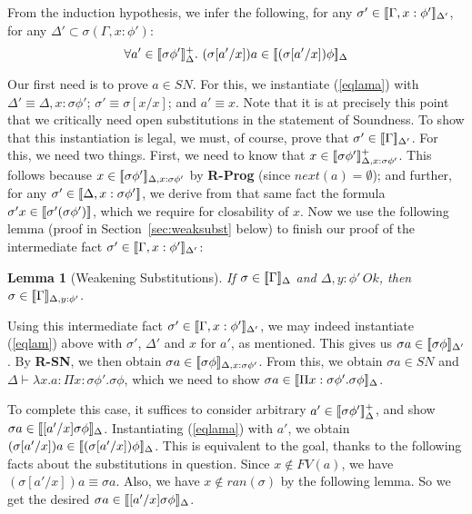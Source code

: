 \documentclass[copyright]{eptcs}
\newtheorem{lemma}{Lemma}
\newcommand{\next}[0]{\textit{next}}
\newcommand{\SN}[0]{\textit{SN}}
\newcommand{\interp}[1]{[\negthinspace[#1]\negthinspace]}
\begin{document}
\noindent From the
induction hypothesis, we infer the following, for any
$\sigma'\in\interp{\Gamma,x:\phi'}_{\Delta'}$, for any
$\Delta'\subset\sigma (\Gamma,x:\phi')$:
\begin{equation}
\label{eqlama}
\forall a'\in\interp{\sigma \phi'}^+_{\Delta}.\ (\sigma[a'/x]) a\in\interp{(\sigma[a'/x])\phi}_{\Delta}
\end{equation}

\noindent Our first need is to prove $a\in\SN$.  For this, we
instantiate (\ref{eqlama}) with $\Delta'\equiv \Delta,x:\sigma\phi'$;
$\sigma'\equiv\sigma[x/x]$; and $a'\equiv x$.  Note that it is at
precisely this point that we critically need open substitutions in the
statement of Soundness.  To show that this instantiation is legal, we
must, of course, prove that $\sigma'\in\interp{\Gamma}_{\Delta'}$.
For this, we need two things.  First, we need to know that
$x\in\interp{\sigma \phi'}^+_{\Delta,x:\sigma\phi'}$.  This follows
because $x\in\interp{\sigma \phi'}_{\Delta,x:\sigma\phi'}$ by
\textbf{R-Prog} (since $\next(a) = \emptyset$); and further, for any
$\sigma'\in\interp{\Delta,x:\sigma\phi'}$, we derive from that same
fact the formula $\sigma' x\in\interp{\sigma'(\sigma\phi')}$, which we
require for closability of $x$.  Now we use the following lemma (proof
in Section~\ref{sec:weaksubst} below) to finish our proof of the
intermediate fact $\sigma'\in\interp{\Gamma,x:\phi'}_{\Delta'}$:

\begin{lemma}[Weakening Substitutions]
\label{lem:weaksubst}
If $\sigma\in\interp{\Gamma}_{\Delta}$ and
$\Delta,y:\phi'\,\textit{Ok}$, then
$\sigma\in\interp{\Gamma}_{\Delta,y:\phi'}$.
\end{lemma}

\noindent Using this intermediate fact
$\sigma'\in\interp{\Gamma,x:\phi'}_{\Delta'}$, we may indeed
instantiate (\ref{eqlam}) above with $\sigma'$, $\Delta'$ and $x$ for
$a'$, as mentioned.  This gives us $\sigma a\in\interp{\sigma
  \phi}_{\Delta'}$. By \textbf{R-SN}, we then obtain $\sigma
a\in\interp{\sigma\phi}_{\Delta,x:\sigma\phi'}$.  From this, we obtain
$\sigma a\in\SN$ and $\Delta\vdash \lambda x.a : \Pi x:\sigma
\phi'.\sigma \phi$, which we need to show $\sigma a\in\interp{\Pi
  x:\sigma\phi'.\sigma\phi}_\Delta$.

To complete this case, it suffices to consider arbitrary
$a'\in\interp{\sigma\phi'}^+_{\Delta}$, and show $\sigma
a\in\interp{[a'/x]\sigma\phi}_{\Delta}$.  Instantiating (\ref{eqlama})
with $a'$, we obtain $(\sigma[a'/x])
a\in\interp{(\sigma[a'/x])\phi}_{\Delta}$.  This is equivalent to the
goal, thanks to the following facts about the substitutions in
question.  Since $x\not\in\textit{FV}(a)$, we have $(\sigma[a'/x])a
\equiv \sigma a$.  Also, we have $x\not\in\textit{ran}(\sigma)$ by the
following lemma.  So we get the desired $\sigma
a\in\interp{[a'/x]\sigma\phi}_{\Delta}$.
\end{document}
